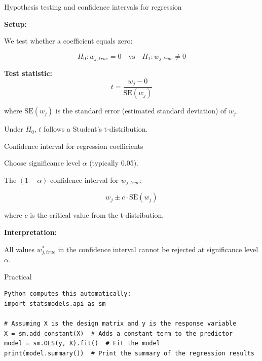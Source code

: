 \documentclass{beamer}
\begin{document}
\begin{frame}{Hypothesis testing and confidence intervals for regression}

\textbf{Setup:}

We test whether a coefficient equals zero:

\[
H_0: w_{j,true} = 0 \quad \text{vs} \quad H_1: w_{j,true} \neq 0
\]

\vspace{0.3cm}

\textbf{Test statistic:}
\[
t = \frac{w_j - 0}{\text{SE}(w_j)}
\]

where $\text{SE}(w_j)$ is the standard error (estimated standard deviation) of $w_j$.

\vspace{0.3cm}

Under $H_0$, $t$ follows a Student's t-distribution.

\end{frame}

\begin{frame}{Confidence interval for regression coefficients}

Choose significance level $\alpha$ (typically 0.05).

\vspace{0.3cm}

The $(1-\alpha)$-confidence interval for $w_{j,true}$:

\[
w_j \pm c \cdot \text{SE}(w_j)
\]

where $c$ is the critical value from the t-distribution.

\vspace{0.3cm}

\textbf{Interpretation:}

All values $w_{j,true}^*$ in the confidence interval cannot be rejected at significance level $\alpha$.

\end{frame}
\begin{frame}[fragile]{Practical}

\begin{verbatim}
Python computes this automatically:
import statsmodels.api as sm

# Assuming X is the design matrix and y is the response variable
X = sm.add_constant(X)  # Adds a constant term to the predictor
model = sm.OLS(y, X).fit()  # Fit the model
print(model.summary())  # Print the summary of the regression results
\end{verbatim}
\end{frame}
\end{document}
